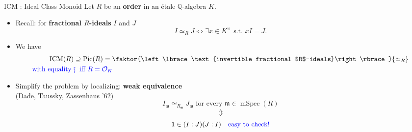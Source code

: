 \documentclass[usenames,dvipsnames]{beamer}
\def\Q{\mathbb{Q}}
\DeclareMathOperator{\ICM}{ICM}
\DeclareMathOperator{\Pic}{Pic}
\DeclareMathOperator{\mSpec}{mSpec}
\newcommand{\cO}{{\mathcal O}}
\renewcommand{\frm}{{\mathfrak m}}
\newcommand{\frf}{{\mathfrak f}}
\newcommand{\set}[1]{\left\lbrace#1\right\rbrace }
\newcommand{\blue}[1]{\textcolor{blue}{#1}}
\begin{document}
\begin{frame}{ICM : Ideal Class Monoid}
    Let $R$ be an {\bf order} in an \'etale  $\Q$-algebra $K$.
    \begin{itemize}
\pause
    \item Recall: for {\bf fractional $R$-ideals} $I$ and $J$
	 \[ I\simeq_R J \Longleftrightarrow \exists x \in K^\times \text{ s.t.~} xI=J. \]
\pause
    \item \vspace*{-1em}
    We have
   	\begin{align*}
    \ICM(R) & \supseteq \Pic(R)=\faktor{\set{\text{invertible fractional $R$-ideals}}}{\simeq_R} \\
	\blue{\text{with equality }} & \blue{\rotatebox[origin=c]{90}{$\large\rightsquigarrow$}\mkern2mu \text{ iff } R=\cO_K }
    \end{align*}
\pause
    \item \vspace*{-1em}
    Simplify the problem by localizing: \textbf{weak equivalence}\\ (Dade, Taussky, Zassenhaus '62)
    \[I_{\frm}\simeq_{R_{\frm}} J_{\frm} \text{ for every } {\frm} \in \mSpec(R)\]
\pause
    \vspace{-6mm}\[\Updownarrow\]
    \[1\in (I:J)(J:I)\quad \textcolor{blue}{\text{easy to check!}}\]
\end{itemize}
\end{frame}

\end{document}
